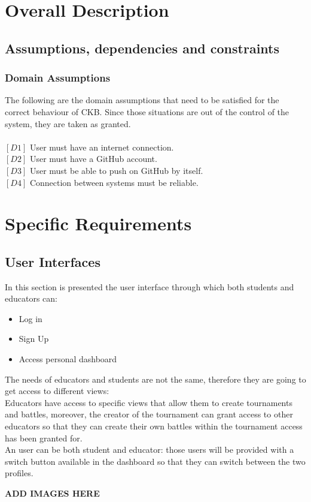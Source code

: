 \documentclass{article}
\begin{document}
\newpage

\section{Overall Description}

\subsection{Assumptions, dependencies and constraints}

\subsubsection{Domain Assumptions}
The following are the domain assumptions that need to be satisfied for the correct behaviour of CKB. Since those situations are out of the control of the system, they are taken as granted.\\\\
$[D1]$ User must have an internet connection.\\
$[D2]$ User must have a GitHub account.\\
$[D3]$ User must be able to push on GitHub by itself.\\
$[D4]$ Connection between systems must be reliable.\\

\section{Specific Requirements}

\subsection{User Interfaces}
In this section is presented the user interface through which both students and educators can:
\begin{itemize}
    \item Log in
    \item Sign Up
    \item Access personal dashboard
\end{itemize}
The needs of educators and students are not the same, therefore they are going to get access to different views:\\
Educators have access to specific views that allow them to create tournaments and battles, moreover, the creator of the tournament can grant access to other educators so that they can create their own battles within the tournament access has been granted for.\\
An user can be both student and educator: those users will be provided with a switch button available in the dashboard so that they can switch between the two profiles.
\begin{center}
    \textbf{ADD IMAGES HERE}\\
\end{center}
\end{document}
